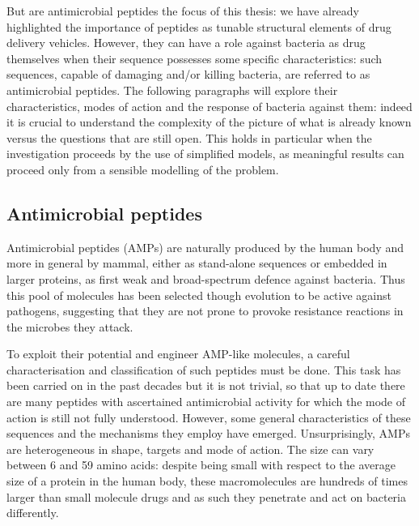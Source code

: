 \documentclass[a4paper,11pt]{extreport}
\begin{document}
But are antimicrobial peptides the focus of this thesis: we have already highlighted the importance of peptides as tunable structural elements of drug delivery vehicles. However, they can have a role against bacteria as drug themselves when their sequence possesses some specific characteristics: such sequences, capable of damaging and/or killing bacteria, are referred to as antimicrobial peptides. The following paragraphs will explore their characteristics, modes of action and the response of bacteria against them: indeed it is crucial to understand the complexity of the picture of what is already known versus the questions that are still open. This holds in particular when the investigation proceeds by the use of simplified models, as meaningful results can proceed only from a sensible  modelling of the problem.


\subsection{Antimicrobial peptides}
Antimicrobial peptides (AMPs) are naturally produced by the human body and more in general by mammal, either as stand-alone sequences or embedded in larger proteins, as first weak and broad-spectrum defence against bacteria.\cite{Nguyen2011,Bahar2013,Mahlapuu2016,Zhang2016}
%
Thus this pool of molecules has been selected though evolution to be active against pathogens, suggesting that they are not prone to provoke resistance reactions in the microbes they attack.

To exploit their potential and engineer AMP-like molecules, a careful characterisation and classification of such peptides must be done. This task has been carried on in the past decades but it is not trivial, so that up to date there are many peptides with ascertained antimicrobial activity for which the mode of action is still not fully understood.\cite{Ebbensgaard2015PLOS???} However, some general characteristics of these sequences and the mechanisms they employ have emerged.
%
Unsurprisingly, AMPs are heterogeneous in shape, targets and mode of action. The size can vary between 6 and 59 amino acids\cite{Brogden2005}: despite being small with respect to the average size of a protein in the human body, these macromolecules are hundreds of times larger than small molecule drugs and as such they penetrate and act on bacteria differently.
\end{document}
